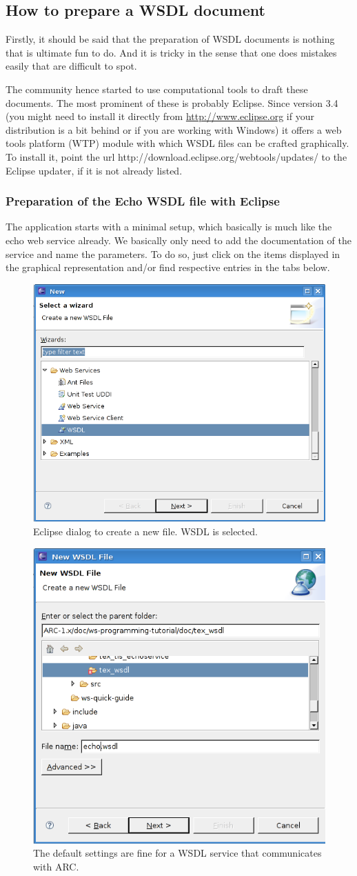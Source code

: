 \subsection{How to prepare a WSDL document}

Firstly, it should be said that the preparation of WSDL documents 
is nothing that is ultimate fun to do. And it is tricky in the sense that
one does mistakes easily that are difficult to spot.

The community hence started to use computational tools to draft these documents.
The most prominent of these is probably Eclipse.
Since version 3.4 (you might need to install it directly from
\url{http://www.eclipse.org} 
if your distribution is a bit behind or if you are working with Windows)
it offers a web tools platform (WTP) module with which WSDL files can be crafted
graphically.  To install it, point the url http://download.eclipse.org/webtools/updates/
to the Eclipse updater, if it is not already listed.

\subsubsection{Preparation of the Echo WSDL file with Eclipse}

The application starts with a minimal setup, which basically is 
much like the echo web service already. We basically only need to add the
documentation of the service and name the parameters. To do so, just click on
the items displayed in the graphical representation and/or find respective
entries in the tabs below.

\begin{figure}
\includegraphics[width=.4\columnwidth]{wsdl_NewFileMenu.png}
\caption{Eclipse dialog to create a new file. WSDL is selected.}
\end{figure}

\begin{figure}
\includegraphics[width=.4\columnwidth]{wsdl_NewWSDLfile.png}
\caption{The default settings are fine for a WSDL service that communicates
with ARC.}
\end{figure}

